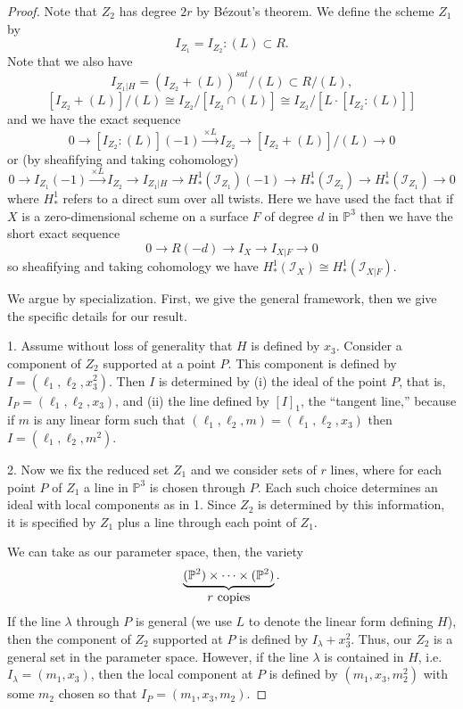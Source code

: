 \documentclass[12pt]{amsart}%
\numberwithin{equation}{section}
\theoremstyle{definition}
\numberwithin{equation}{section}
\newcommand{\PP}{ \ensuremath{\mathbb{P}}}
\begin{document}
\begin{proof} 
Note that $Z_2$ has degree $2r$ by B\'ezout's theorem. We define the scheme $Z_1$ by
\[
I_{Z_1}  =  I_{Z_2} : (L) \subset R.
\]
Note that we also have 
\[
I_{Z_1 |H}  =  (I_{Z_2} + (L))^{sat}/(L) \subset R/(L) ,
\]
\[
 [I_{Z_2} + (L)]/(L) \cong I_{Z_2} / [I_{Z_2} \cap (L)] \cong  I_{Z_2} / [L \cdot [I_{Z_2} : (L) ]]
\]
and we have the exact sequence
\[
0 \rightarrow [I_{Z_2} : (L)](-1) \stackrel{\times L}{\longrightarrow} I_{Z_2} \rightarrow [I_{Z_2} + (L)]/(L) \rightarrow 0
\]
or (by sheafifying and taking cohomology)
\begin{equation} \label{usual exact seq}
0 \rightarrow I_{Z_1}(-1) \stackrel{\times L}{\longrightarrow} I_{Z_2} \rightarrow I_{Z_1 |H} \rightarrow H^1_*(\mathcal I_{Z_1})(-1) \rightarrow H^1_* (\mathcal I_{Z_2}) \rightarrow H^1_* (\mathcal I_{Z_1}) \rightarrow 0
\end{equation}
where $H^1_*$ refers to a direct sum over all twists. Here we have used the fact that if $X$ is a zero-dimensional scheme on a surface $F$ of degree $d$  in $\PP^3$ then we have the short exact sequence
\[
0 \rightarrow R(-d) \rightarrow I_X \rightarrow I_{X|F} \rightarrow 0
\]
so sheafifying and taking cohomology we have $H^1_*(\mathcal I_X) \cong H^1_*(\mathcal I_{X|F})$.



We argue by specialization. First, we give the general framework, then we give the specific details for our result.

1. Assume without loss of generality that $H$ is defined by $x_3$. Consider a component of $Z_2$ supported at a point $P$. This  component is defined by $I = (\ell_1, \ell_2, x_3^2)$. Then $I$ is determined by (i) the ideal of the point $P$, that is, $I_P = (\ell_1, \ell_2, x_3)$, and (ii) the line defined by $[I]_1$, the “tangent line,” because if $m$ is any linear form such that $(\ell_1, \ell_2, m) = (\ell_1, \ell_2, x_3)$ then 
$I = (\ell_1, \ell_2, m^2)$. 

2. Now we fix the reduced set $Z_1$ and we consider sets of $r$ lines, where for each point $P$ of $Z_1$ a line in $\mathbb P^3$ is chosen through $P$. Each such choice determines an ideal with local components as in 1. 
 Since $Z_2$ is determined by this information, it is specified by $Z_1$ plus a line through each point of $Z_1$.

We can take as our parameter space, then, the variety
\[
\underbrace{(\mathbb P^2) \times \dots \times  (\mathbb P^2)}_{\hbox{$r$ copies}}.
\]
If the line {$\lambda$ } through $P$ is general (we use $L$ to denote the linear form defining $H$), then the component of $Z_2$ supported at $P$ is defined by $I_\lambda + x_3^2$.
Thus, our $Z_2$ is a general set in the parameter space. 
However, if the line $\lambda$ is contained in $H$, i.e. $I_\lambda = (m_1, x_3)$, then the local component at $P$ is defined by 
$(m_1, x_3, m_2^2)$ with some $m_2$ chosen so that $I_P = (m_1, x_3, m_2)$. 


\end{proof}
\end{document}

